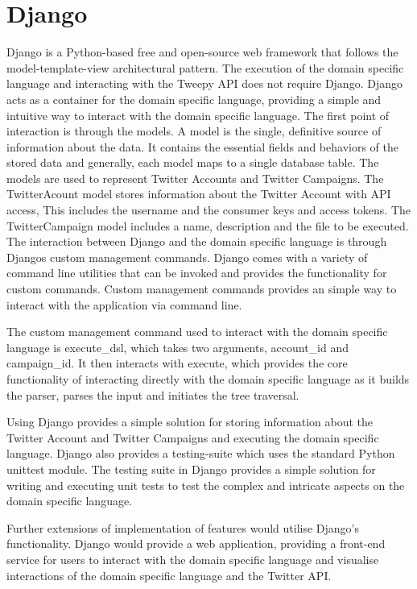 \section{Django}

Django is a Python-based free and open-source web framework that follows the model-template-view architectural pattern. The execution of the domain specific language and interacting with the Tweepy API does not require Django. Django acts as a container for the domain specific language, providing a simple and intuitive way to interact with the domain specific language. The first point of interaction is through the models. A model is the single, definitive source of information about the data. It contains the essential fields and behaviors of the stored data and generally, each model maps to a single database table. The models are used to represent Twitter Accounts and Twitter Campaigns. The TwitterAcount model stores information about the Twitter Account with API access, This includes the username and the consumer keys and access tokens. The TwitterCampaign model includes a name, description and the file to be executed. The interaction between Django and the domain specific language is through Djangos custom management commands. Django comes with a variety of command line utilities that can be invoked and provides the functionality for custom commands. Custom management commands provides an simple way to interact with the application via command line. \newline \par

The custom management command used to interact with the domain specific language is execute\_dsl, which takes two arguments, account\_id and campaign\_id. It then interacts with execute, which provides the core functionality of interacting directly with the domain specific language as it builds the parser, parses the input and initiates the tree traversal. \newline \par

Using Django provides a simple solution for storing information about the Twitter Account and Twitter Campaigns and executing the domain specific language. Django also provides a testing-suite which uses the standard Python unittest module. The testing suite in Django provides a simple solution for writing and executing unit tests to test the complex and intricate aspects on the domain specific language. \newline \par

Further extensions of implementation of features would utilise Django's functionality. Django would provide a web application, providing a front-end service for users to interact with the domain specific language and visualise interactions of the domain specific language and the Twitter API. 